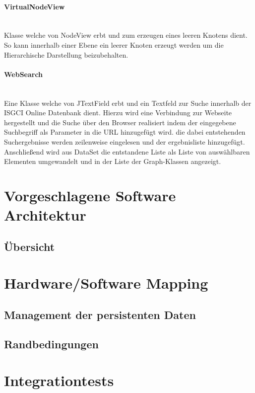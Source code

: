 \documentclass[10pt,a4paper]{article}
\begin{document}
\paragraph{VirtualNodeView}\ \\Klasse welche von NodeView erbt und zum erzeugen eines leeren Knotens dient. So kann innerhalb einer Ebene ein leerer Knoten erzeugt werden um die Hierarchische Darstellung beizubehalten.

\paragraph{WebSearch}\ \\Eine Klasse welche von JTextField erbt und ein Textfeld zur Suche innerhalb der ISGCI Online Datenbank dient. Hierzu wird eine Verbindung zur Webseite hergestellt und die Suche über den Browser realisiert indem der eingegebene Suchbegriff als Parameter in die URL hinzugefügt wird. die dabei entstehenden Suchergebnisse werden zeilenweise eingelesen und der ergebnisliste hinzugefügt. Anschließend wird aus DataSet die entstandene Liste als Liste von auswählbaren Elementen umgewandelt und in der Liste der Graph-Klassen angezeigt. 



\section{Vorgeschlagene Software Architektur}
\subsection{Übersicht}
\section{Hardware/Software Mapping}
\subsection{Management der persistenten Daten}
\subsection{Randbedingungen}


\section{Integrationtests}
\end{document}
